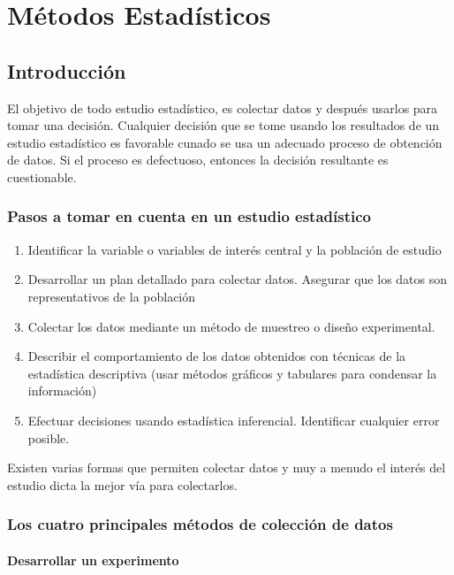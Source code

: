 \chapter{Métodos Estadísticos}

\section{Introducción}
El objetivo de todo estudio estadístico, es colectar datos y después usarlos para tomar una decisión. Cualquier decisión que se tome usando los resultados de un estudio estadístico es favorable cunado se usa un adecuado proceso de obtención de datos.
Si el proceso es defectuoso, entonces la decisión resultante es cuestionable.

\subsection{Pasos a tomar en cuenta en un estudio estadístico}

\begin{enumerate}
    \item Identificar la variable o variables de interés central y la población de estudio
    \item Desarrollar un plan detallado para colectar datos. Asegurar que los datos son representativos de la población
    \item Colectar los datos mediante un método de muestreo o diseño experimental.
    \item Describir el comportamiento de los datos obtenidos con técnicas de la estadística descriptiva (usar métodos gráficos y tabulares para condensar la información)
    \item Efectuar decisiones usando estadística inferencial. Identificar cualquier error posible.
\end{enumerate}

Existen varias formas que permiten colectar datos y muy a menudo el interés del estudio dicta la mejor vía para colectarlos.

\subsection{Los cuatro principales métodos de colección de datos}

\subsubsection{Desarrollar un experimento}


